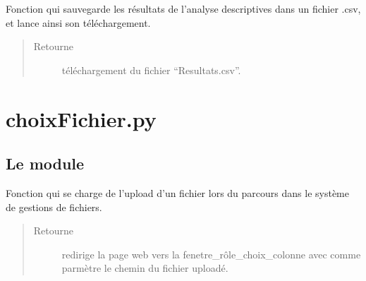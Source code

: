 \documentclass[letterpaper,10pt,openany,oneside,french]{sphinxmanual}
\begin{document}
\begin{fulllineitems}
\label{\detokenize{gestionFlux:interface_web.gestionFlux.sauvegardeResultats}}
Fonction qui sauvegarde les résultats de l’analyse descriptives dans un fichier .csv, et lance ainsi son téléchargement.
\begin{quote}\begin{description}
\item[{Retourne}] \leavevmode
téléchargement du fichier “Resultats.csv”.

\end{description}\end{quote}

\end{fulllineitems}



\chapter{choixFichier.py}
\label{\detokenize{choixFichier:module-interface_web.choixFichier}}\label{\detokenize{choixFichier::doc}}\label{\detokenize{choixFichier:choixfichier-py}}

\section{Le module }
\label{\detokenize{choixFichier:le-module-fenetre-choix-fichier}}

\begin{fulllineitems}
\label{\detokenize{choixFichier:interface_web.choixFichier.FileWithSGF}}
Fonction qui se charge de l’upload d’un fichier lors du parcours dans le système de gestions de fichiers.
\begin{quote}\begin{description}
\item[{Retourne}] \leavevmode
redirige la page web vers la fenetre\_rôle\_choix\_colonne avec comme parmètre le chemin du fichier uploadé.

\end{description}\end{quote}

\end{fulllineitems}
\end{document}
